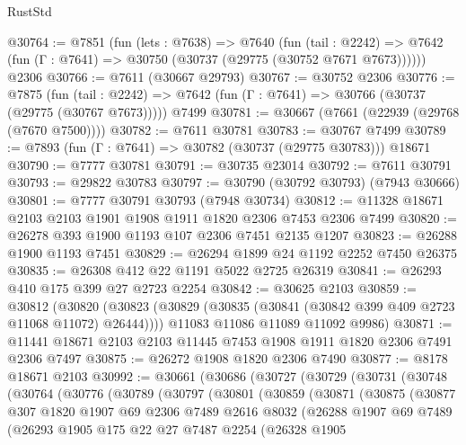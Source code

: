 \begin{lexlean}{RustStd}
\begin{coremodule}
@30764 := @7851
    (fun (lets : @7638) =>
    @7640
      (fun (tail : @2242) =>
      @7642 (fun (Γ : @7641) => @30750 (@30737 (@29775 (@30752 @7671 @7673))))))
    @2306
@30766 := @7611 (@30667 @29793)
@30767 := @30752 @2306
@30776 := @7875
    (fun (tail : @2242) => @7642 (fun (Γ : @7641) => @30766 (@30737 (@29775 (@30767 @7673)))))
    @7499
@30781 := @30667 (@7661 (@22939 (@29768 (@7670 @7500))))
@30782 := @7611 @30781
@30783 := @30767 @7499
@30789 := @7893 (fun (Γ : @7641) => @30782 (@30737 (@29775 @30783))) @18671
@30790 := @7777 @30781
@30791 := @30735 @23014
@30792 := @7611 @30791
@30793 := @29822 @30783
@30797 := @30790 (@30792 @30793) (@7943 @30666)
@30801 := @7777 @30791 @30793 (@7948 @30734)
@30812 := @11328 @18671 @2103 @2103 @1901 @1908 @1911 @1820 @2306 @7453 @2306 @7499
@30820 := @26278 @393 @1900 @1193 @107 @2306 @7451 @2135 @1207
@30823 := @26288 @1900 @1193 @7451
@30829 := @26294 @1899 @24 @1192 @2252 @7450 @26375
@30835 := @26308 @412 @22 @1191 @5022 @2725 @26319
@30841 := @26293 @410 @175 @399 @27 @2723 @2254
@30842 := @30625 @2103
@30859 := @30812
    (@30820
      (@30823 (@30829 (@30835 (@30841 (@30842 @399 @409 @2723 @11068 @11072) @26444))))
      @11083
      @11086
      @11089
      @11092
      @9986)
@30871 := @11441 @18671 @2103 @2103 @11445 @7453 @1908 @1911 @1820 @2306 @7491 @2306 @7497
@30875 := @26272 @1908 @1820 @2306 @7490
@30877 := @8178 @18671 @2103
@30992 := @30661
    (@30686
      (@30727
        (@30729
          (@30731
            (@30748
              (@30764
                (@30776
                  (@30789
                    (@30797
                      (@30801
                        (@30859
                          (@30871
                            (@30875
                              (@30877
                                @307
                                @1820
                                @1907
                                @69
                                @2306
                                @7489
                                @2616
                                @8032
                                (@26288
                                  @1907
                                  @69
                                  @7489
                                  (@26293
                                    @1905
                                    @175
                                    @22
                                    @27
                                    @7487
                                    @2254
                                    (@26328
                                      @1905

\end{coremodule}
\end{lexlean}
